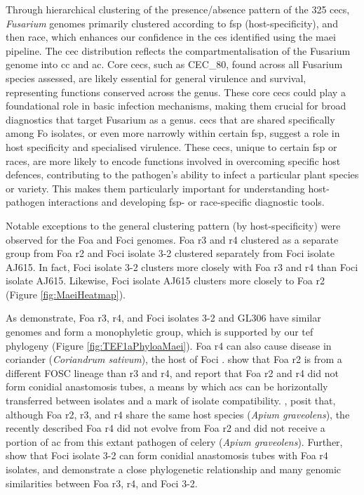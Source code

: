 \bigskip
\noindent
Through hierarchical clustering of the presence/absence pattern of the 325 \acp{cec}, \textit{Fusarium} genomes primarily clustered according to \ac{fsp} (host-specificity), and then race, which enhances our confidence in the \acp{ce} identified using the \ac{maei} pipeline. The \ac{cec} distribution reflects the compartmentalisation of the Fusarium genome into \acf{cc} and \acf{ac}. Core \acp{cec}, such as CEC\_80, found across all Fusarium species assessed, are likely essential for general virulence and survival, representing functions conserved across the genus. These core \acp{cec} could play a foundational role in basic infection mechanisms, making them crucial for broad diagnostics that target Fusarium as a genus. \acp{cec} that are shared specifically among \ac{Fo} isolates, or even more narrowly within certain \ac{fsp}, suggest a role in host specificity and specialised virulence. These \acp{cec}, unique to certain \ac{fsp} or races, are more likely to encode functions involved in overcoming specific host defences, contributing to the pathogen's ability to infect a particular plant species or variety. This makes them particularly important for understanding host-pathogen interactions and developing \ac{fsp}- or race-specific diagnostic tools.

Notable exceptions to the general clustering pattern (by host-specificity) were observed for the \ac{Foa} and \ac{Foci} genomes. \ac{Foa} \ac{r3} and \ac{r4} clustered as a separate group from \ac{Foa} \ac{r2} and \ac{Foci} isolate 3-2 clustered separately from \ac{Foci} isolate AJ615. In fact, \ac{Foci} isolate 3-2 clusters more closely with \ac{Foa} \ac{r3} and \ac{r4} than \ac{Foci} isolate AJ615. Likewise, \ac{Foci} isolate AJ615 clusters more closely to \ac{Foa} \ac{r2} (Figure \ref{fig:MaeiHeatmap}).

As \textcite{Henry2020} demonstrate, \ac{Foa} \ac{r3}, \ac{r4}, and \ac{Foci} isolates 3-2 and GL306 have similar genomes and form a monophyletic group, which is supported by our \ac{tef} phylogeny (Figure \ref{fig:TEF1aPhyloaMaei}). \ac{Foa} \ac{r4} can also cause disease in coriander (\textit{Coriandrum sativum}), the host of \ac{Foci} \parencite{Epstein2022}. \textcite{Henry2020, Epstein2022} show that \ac{Foa} \ac{r2} is from a different \ac{FOSC} lineage than \ac{r3} and \ac{r4}, and report that \ac{Foa} \ac{r2} and \ac{r4} did not form conidial anastomosis tubes, a means by which \acp{ac} can be horizontally transferred between isolates and a mark of isolate compatibility. \textcite{Epstein2022}, posit that, although \ac{Foa} \ac{r2}, \ac{r3}, and \ac{r4} share the same host species (\textit{Apium graveolens}), the recently described \ac{Foa} \ac{r4} did not evolve from \ac{Foa} \ac{r2} and did not receive a portion of \ac{ac} from this extant pathogen of celery (\textit{Apium graveolens}). Further, \textcite{Epstein2022} show that \ac{Foci} isolate 3-2 can form conidial anastomosis tubes with \ac{Foa} \ac{r4} isolates, and \textcite{Henry2020} demonstrate a close phylogenetic relationship and many genomic similarities between \ac{Foa} \ac{r3}, \ac{r4}, and \ac{Foci} 3-2. 

